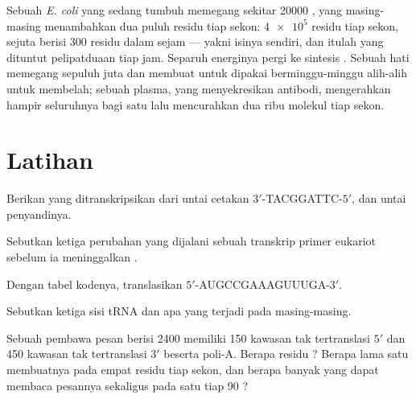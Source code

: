 \begin{example}\label{ex:b1:gene-expression:numbers}
Sebuah \emph{E. coli} yang sedang tumbuh memegang sekitar \num{20000}
, yang masing-masing menambahkan dua puluh residu tiap sekon:
$\num{4e5}$ residu tiap sekon, sejuta  berisi \qty{300}{} residu
dalam sejam --- yakni isinya sendiri, dan itulah yang dituntut
pelipatduaan tiap jam. Separuh energinya pergi ke sintesis .
Sebuah  hati memegang sepuluh juta  dan membuat 
untuk dipakai berminggu-minggu alih-alih untuk membelah; sebuah 
plasma, yang menyekresikan antibodi, mengerahkan hampir seluruhnya bagi
satu  lalu mencurahkan dua ribu molekul tiap sekon.
\end{example}

\section{Latihan}

\begin{exercise}[$\star$]\label{exo:b1:gene-expression:1}
Berikan  yang ditranskripsikan dari untai cetakan
$3'$-TACGGATTC-$5'$, dan untai penyandinya.
\end{exercise}

\begin{exercise}[$\star$]\label{exo:b1:gene-expression:2}
Sebutkan ketiga perubahan yang dijalani sebuah transkrip primer
eukariot sebelum ia meninggalkan .
\end{exercise}

\begin{exercise}[$\star$]\label{exo:b1:gene-expression:3}
Dengan tabel kodenya, translasikan $5'$-AUGCCGAAAGUUUGA-$3'$.
\end{exercise}

\begin{exercise}[$\star$]\label{exo:b1:gene-expression:4}
Sebutkan ketiga sisi tRNA  dan apa yang terjadi pada
masing-masing.
\end{exercise}

\begin{exercise}[$\star\star$]\label{exo:b1:gene-expression:5}
Sebuah pembawa pesan berisi \qty{2400}{}  memiliki
\qty{150}{} kawasan tak tertranslasi $5'$ dan \qty{450}{} kawasan tak
tertranslasi $3'$ beserta poli-A. Berapa residu ? Berapa lama
satu  membuatnya pada empat residu tiap sekon, dan berapa banyak
 yang dapat membaca pesannya sekaligus pada satu tiap \qty{90}{}
?
\end{exercise}

